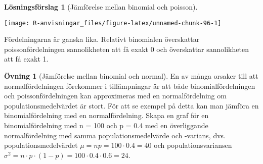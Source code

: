 \documentclass[
]{book}
\theoremstyle{definition}
\theoremstyle{definition}
\theoremstyle{definition}
\newtheorem{exercise}{Övning}[chapter]
\theoremstyle{definition}
\newtheorem{hypothesis}{Lösningsförslag}[chapter]
\theoremstyle{remark}
\begin{document}
\begin{hypothesis}[Jämförelse mellan binomial och poisson]
\begin{center}\texttt{[image: R-anvisningar\_files/figure-latex/unnamed-chunk-96-1]} \end{center}

Fördelningarna är ganska lika. Relativt binomialen överskattar poissonfördelningen sannolikheten att få exakt 0 och överskattar sannolikheten att få exakt 1.
\end{hypothesis}

\begin{exercise}[Jämförelse mellan binomial och normal]
En av många orsaker till att normalfördelningen förekommer i tillämpningar är att både binomialfördelningen och poissonfördelningen kan approximeras med en normalfördelning om populationsmedelvärdet är stort. För att se exempel på detta kan man jämföra en binomialfördelning med en normalfördelning. Skapa en graf för en binomialfördelning med n = 100 och p = 0.4 med en överliggande normalfördelning med samma populationsmedelvärde och -varians, dvs. populationsmedelvärdet \(\mu = np = 100 \cdot 0.4 = 40\) och populationsvariansen \(\sigma^2 = n\cdot p \cdot (1-p) = 100 \cdot 0.4 \cdot 0.6 = 24\).
\end{exercise}
\end{document}
